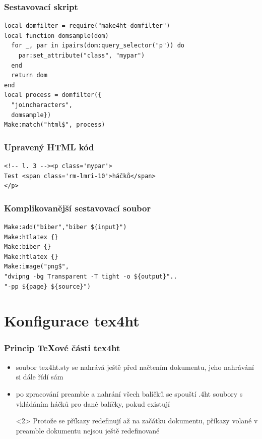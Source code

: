 \begin{frame}[fragile]
  \frametitle{Sestavovací skript}
  \begin{priklad}
\begin{verbatim}
local domfilter = require("make4ht-domfilter")
local function domsample(dom)
  for _, par in ipairs(dom:query_selector("p")) do
    par:set_attribute("class", "mypar")
  end
  return dom
end
local process = domfilter({
  "joincharacters", 
  domsample})
Make:match("html$", process)
\end{verbatim}
  \end{priklad}
\end{frame}

\begin{frame}[fragile]
  \frametitle{Upravený HTML kód}
  \begin{priklad}
\begin{verbatim}
<!-- l. 3 --><p class='mypar'>
Test <span class='rm-lmri-10'>háčků</span> 
</p> 
\end{verbatim}
  \end{priklad}
\end{frame}

\begin{frame}[fragile]
  \frametitle{Komplikovanější sestavovací soubor}
  \begin{priklad}
\begin{verbatim}
Make:add("biber","biber ${input}")
Make:htlatex {}
Make:biber {}
Make:htlatex {}
Make:image("png$",                                                          
"dvipng -bg Transparent -T tight -o ${output}"..
"-pp ${page} ${source}")
\end{verbatim}
  \end{priklad}
\end{frame}

\section{Konfigurace tex4ht}
\begin{frame}
  \frametitle{Princip TeXové části tex4ht}
  \begin{itemize}
    \item soubor tex4ht.sty se nahrává ještě před načtením dokumentu, jeho
      nahrávání si dále řídí sám
  \item po zpracování preamble a nahrání všech balíčků se spouští .4ht soubory
    s vkládáním háčků pro dané balíčky, pokud existují
    \begin{pozor}<2>
      Protože se příkazy redefinují až na začátku dokumentu, příkazy
      volané v preamble dokumentu nejsou ještě redefinované
    \end{pozor}
\end{itemize}
\end{frame}

